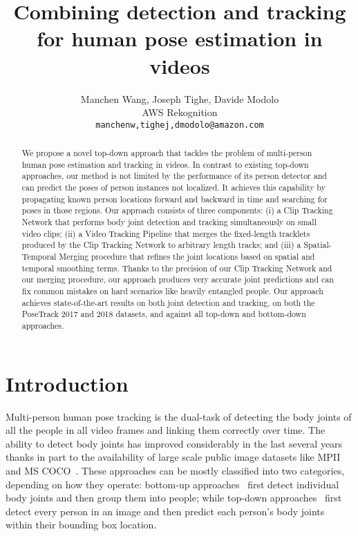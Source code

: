 \documentclass[10pt,twocolumn,letterpaper]{article}
\begin{document}
\title{Combining detection and tracking for human pose estimation in videos}


\author{Manchen Wang,  Joseph Tighe,  Davide Modolo\\ 
AWS Rekognition \\
{\tt\small manchenw,tighej,dmodolo@amazon.com}}

\maketitle
\thispagestyle{empty}


\begin{abstract}
We propose a novel top-down approach that tackles the problem of multi-person human pose estimation and tracking in videos. In contrast to existing top-down approaches, our method is not limited by the performance of its person detector and can predict the poses of person instances not localized. It achieves this capability by propagating known person locations forward and backward in time and searching for poses in those regions. Our approach consists of three components: (i) a Clip Tracking Network that performs body joint detection and tracking simultaneously on small video clips; (ii) a Video Tracking Pipeline that merges the fixed-length tracklets produced by the Clip Tracking Network to arbitrary length tracks; and (iii) a Spatial-Temporal Merging procedure that refines the joint locations based on spatial and temporal smoothing terms. Thanks to the precision of our Clip Tracking Network and our merging procedure, our approach produces very accurate joint predictions and can fix common mistakes on hard scenarios like heavily entangled people. Our approach achieves state-of-the-art results on both joint detection and tracking, on both the PoseTrack 2017 and 2018 datasets, and against all top-down and bottom-down approaches.
\end{abstract}


\vspace{-4mm}
\section{Introduction}

Multi-person human pose tracking is the dual-task of detecting the body joints of all the people in all video frames and linking them correctly over time. 
The ability to detect body joints has improved considerably in the last several years~\cite{andriluka14cvpr,pishchulin16cvpr,wei16cvpr,newell16eccv,insafutdinov16eccv,newell2017associative,cao2018openpose,chen2018cascaded, he2017mask, sun2019deep} thanks in part to the availability of large scale public image datasets like MPII~\cite{andriluka14cvpr} and MS COCO~\cite{lin2014microsoft}. 
These approaches can be mostly classified into two categories, depending on how they operate: bottom-up approaches~\cite{andriluka14cvpr, wei16cvpr, cao2018openpose, insafutdinov16eccv, newell2017associative, pishchulin16cvpr} first detect individual body joints and then group them into people; while top-down approaches~\cite{chen2018cascaded, he2017mask, sun2019deep} first detect every person in an image and then predict each person's body joints within their bounding box location. 
\end{document}
